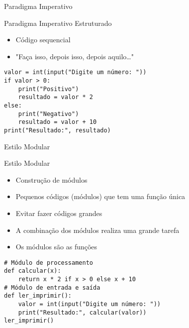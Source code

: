 \begin{frame}[fragile]{Paradigma Imperativo}

    \begin{block}{Paradigma Imperativo Estruturado}
        \begin{itemize}
            \item Código sequencial
            \item "Faça isso, depois isso, depois aquilo…"
        \end{itemize}
        \begin{verbatim}
valor = int(input("Digite um número: "))
if valor > 0:
    print("Positivo")
    resultado = valor * 2
else:
    print("Negativo")
    resultado = valor + 10
print("Resultado:", resultado)
\end{verbatim}
        \vspace{-0.3cm}

    \end{block}
\end{frame}

\begin{frame}[fragile]{Estilo Modular}
    \begin{block}{Estilo Modular}
        \begin{itemize}
            \item Construção de módulos
            \item Pequenos códigos (módulos) que tem uma função única
            \item Evitar fazer códigos grandes
            \item A combinação dos módulos realiza uma grande tarefa
            \item Os módulos são as funções

        \end{itemize}
        \begin{verbatim}
# Módulo de processamento
def calcular(x):
    return x * 2 if x > 0 else x + 10
# Módulo de entrada e saída
def ler_imprimir():
    valor = int(input("Digite um número: "))
    print("Resultado:", calcular(valor))
ler_imprimir()
\end{verbatim}
        \vspace{-0.3cm}

    \end{block}


\end{frame}



